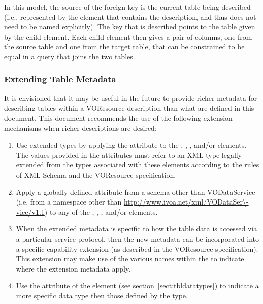 \documentclass[11pt,a4paper]{ivoa}
\begin{document}


In this model, the source of the foreign
key is the current table being described (i.e., represented by the
 element that contains the
 description, and thus does not need to be
named explicitly).  The key that is described points to the table
given by the  child element.  Each child
 element then gives a pair of columns, one
from the source table and one from the target table, that can be
constrained to be equal in a query that joins the two tables.  






\subsubsection{Extending Table Metadata}
\label{sect:tblext}

It is envisioned that it may be useful in the future to provide richer
metadata for describing tables within a VOResource description than
what are defined in this document.  This document recommends the
use of the following extension mechanisms when richer descriptions are
desired:

\begin{enumerate}
\item Use extended types by applying the 
       attribute to the ,
       , , 
        and/or
        elements.  The values provided in the
       attributes must refer to an XML type legally extended from the types
       associated with these elements according to the rules of XML Schema
       \citep{std:XSD} and the VOResource specification.

\item Apply a globally-defined attribute from a schema other than
       VODataService (i.e. from a namespace other than
       \url{http://www.ivoa.net/xml/VODataSer\-vice/v1.1}) to any of the
       , ,
       , and/or 
       elements.

\item When the extended metadata is specific to how the table data is
       accessed via a particular service protocol, then the new
       metadata can be incorporated into a specific capability
       extension (as described in the VOResource specification).  
       This extension may make use of the
       various names within the  to
       indicate where the extension metadata apply.

\item Use the  attribute of the
        element (see 
       section~\ref{sect:tbldatatypes})
       to indicate a more specific data type then those defined by the
        type.
\end{enumerate}
\end{document}
